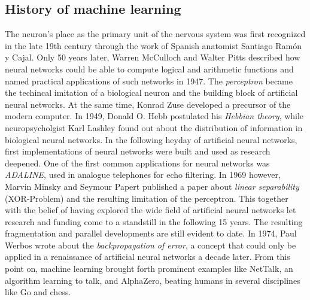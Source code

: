 \documentclass[12pt,a4]{article}
\begin{document}
\subsection{History of machine learning}
The neuron's place as the primary unit of the nervous system was first recognized in the late 19th century through the work of Spanish anatomist Santiago Ramón y Cajal.
\citep{RCajal} 
\newline \newline
Only 50 years later, Warren McCulloch and Walter Pitts described how neural networks could be able to compute logical and arithmetic functions and named practical applications of such networks in 1947. The \emph{perceptron} became the techincal imitation of a biological neuron and the building block of artificial neural networks. At the same time, Konrad Zuse developed a precursor of the modern computer. 
In 1949, Donald O. Hebb postulated his \emph{Hebbian theory}, while neuropsycholgist Karl Lashley found out about the distribution of information in biological neural networks. \citep{wikiNeuron}
\newline \newline
In the following heyday of artificial neural networks, first implementations of neural networks were built and used as research deepened. One of the first common applications for neural networks was \emph{ADALINE}, used in analogue telephones for echo filtering.
\newline \newline
In 1969 however, Marvin Minsky and Seymour Papert published a paper about \emph{linear separability} (XOR-Problem) and the resulting limitation of the perceptron. This together with the belief of having explored the wide field of artificial neural networks let research and funding come to a standstill in the following 15 years. The resulting fragmentation and parallel developments are still evident to date.
\newline \newline
In 1974, Paul Werbos wrote about the \emph{backpropagation of error}, a concept that could only be applied in a renaissance of artificial neural networks a decade later. From this point on, machine learning brought forth prominent examples like NetTalk, an algorithm learning to talk, and AlphaZero, beating humans in several disciplines like Go and chess. \citep{KrieselKNN}
\end{document}
